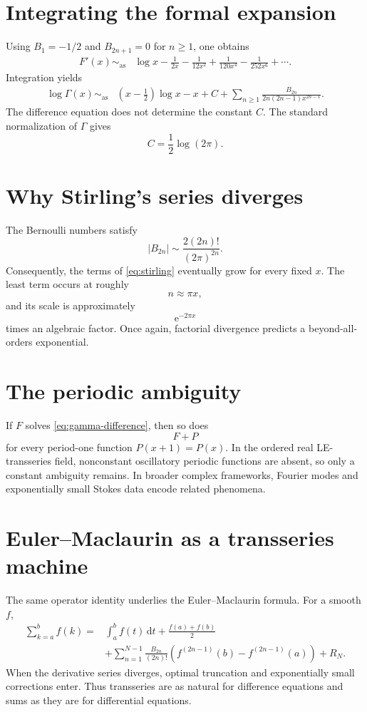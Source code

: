 \documentclass[11pt,openany]{book}
\theoremstyle{plain}
\theoremstyle{definition}
\theoremstyle{remark}
\newcommand{\dd}{\,\mathrm{d}}
\newcommand{\e}{\mathrm{e}}
\newcommand{\asympseries}{\sim_{\mathrm{as}}}
\begin{document}
\section{Integrating the formal expansion}
Using $B_1=-1/2$ and $B_{2n+1}=0$ for $n\ge1$, one obtains
\begin{align*}
 F'(x)\asympseries{}&\log x-\frac{1}{2x}
 -\frac{1}{12x^2}+\frac{1}{120x^4}
 -\frac{1}{252x^6}+\cdots.
\end{align*}
Integration yields
\begin{align}
 \log\Gamma(x)\asympseries{}&
 \left(x-\frac12\right)\log x-x+C
 +\sum_{n\ge1}
 \frac{B_{2n}}{2n(2n-1)x^{2n-1}}.
 \label{eq:stirling}
\end{align}
The difference equation does not determine the constant $C$. The standard normalization of $\Gamma$ gives
\[
  C=\frac12\log(2\pi).
\]

\section{Why Stirling's series diverges}
The Bernoulli numbers satisfy
\[
  |B_{2n}|\sim
  \frac{2(2n)!}{(2\pi)^{2n}}.
\]
Consequently, the terms of \cref{eq:stirling} eventually grow for every fixed $x$. The least term occurs at roughly
\[
  n\approx\pi x,
\]
and its scale is approximately
\[
  \e^{-2\pi x}
\]
times an algebraic factor. Once again, factorial divergence predicts a beyond-all-orders exponential.

\section{The periodic ambiguity}
If $F$ solves \cref{eq:gamma-difference}, then so does
\[
  F+P
\]
for every period-one function $P(x+1)=P(x)$. In the ordered real LE-transseries field, nonconstant oscillatory periodic functions are absent, so only a constant ambiguity remains. In broader complex frameworks, Fourier modes and exponentially small Stokes data encode related phenomena.

\section{Euler--Maclaurin as a transseries machine}
The same operator identity underlies the Euler--Maclaurin formula. For a smooth $f$,
\begin{align*}
 \sum_{k=a}^{b}f(k)
 ={}&\int_a^b f(t)\dd t+\frac{f(a)+f(b)}2\\
 &+\sum_{n=1}^{N-1}\frac{B_{2n}}{(2n)!}
 \left(f^{(2n-1)}(b)-f^{(2n-1)}(a)\right)+R_N.
\end{align*}
When the derivative series diverges, optimal truncation and exponentially small corrections enter. Thus transseries are as natural for difference equations and sums as they are for differential equations.
\end{document}
